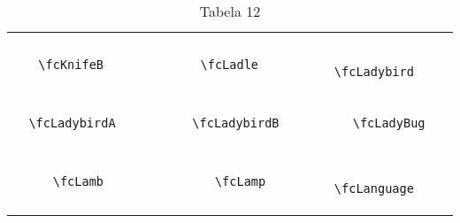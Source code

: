 \documentclass[x11names]{article}
\begin{document}
\begin{table}[H]
\begin{tabular}{|c|c|c|c|c|c|}
		&\multirow{5}{*}{	\fcKnifeB	[scale=0.4]} & &\multirow{5}{*}{	\fcLadle	[scale=0.4]} & &\multirow{5}{*}{	\fcLadybird	[scale=0.4]}\\	& & & & & \\	& & & & & \\	\verb|	\fcKnifeB	| & & \verb|	\fcLadle	| & & \verb|	\fcLadybird	| & \\	& & & & & \\	& & & & & \\	& & & & & \\	\hline									
		&\multirow{5}{*}{	\fcLadybirdA	[scale=0.4]} & &\multirow{5}{*}{	\fcLadybirdB	[scale=0.4]} & &\multirow{5}{*}{	\fcLadyBug	[scale=0.8]}\\	& & & & & \\	& & & & & \\	\verb|	\fcLadybirdA	| & & \verb|	\fcLadybirdB	| & & \verb|	\fcLadyBug	| & \\	& & & & & \\	& & & & & \\	& & & & & \\	\hline									
		&\multirow{5}{*}{	\fcLamb	[scale=0.4]} & &\multirow{5}{*}{	\fcLamp	[scale=0.4]} & &\multirow{5}{*}{	\fcLanguage	[scale=0.4]}\\	& & & & & \\	& & & & & \\	\verb|	\fcLamb	| & & \verb|	\fcLamp	| & & \verb|	\fcLanguage	| & \\	& & & & & \\	& & & & & \\	& & & & & \\		\hline 	\hline 	\end{tabular}	\caption{	Tabela 12	}\label{	Tab12	}\end{table}
\end{document}
